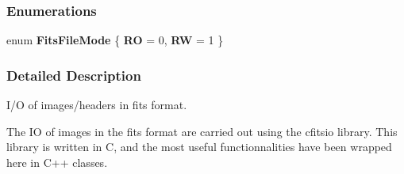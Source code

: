 \subsubsection*{Enumerations}
\begin{CompactItemize}
\item 
enum {\bf Fits\-File\-Mode} \{ {\bf RO} =  0, 
{\bf RW} =  1
 \}
\end{CompactItemize}


\subsubsection{Detailed Description}
I/O of images/headers in fits format.

The IO of images in the fits format are carried out using the cfitsio library. This library is written in C, and the most useful functionnalities have been wrapped here in C++ classes.

